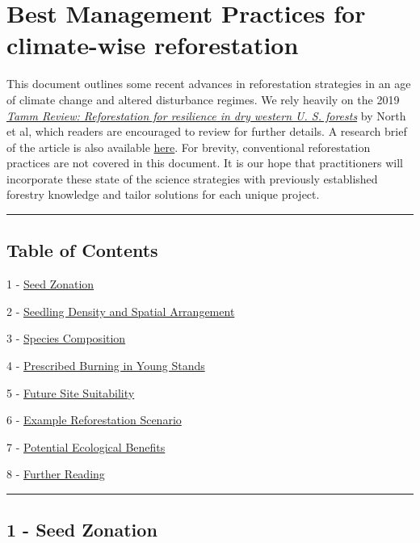\documentclass[]{article}
\title{}
\author{}
\date{}
\begin{document}
{
\setcounter{tocdepth}{2}
\tableofcontents
}
\hypertarget{top}{\section{Best Management Practices for climate-wise
reforestation}\label{top}}

This document outlines some recent advances in reforestation strategies
in an age of climate change and altered disturbance regimes. We rely
heavily on the 2019
\href{https://www.sciencedirect.com/science/article/pii/S0378112718313161?via\%3Dihub}{\emph{Tamm
Review: Reforestation for resilience in dry western U. S. forests}} by
North et al, which readers are encouraged to review for further details.
A research brief of the article is also available \href{}{here}. For
brevity, conventional reforestation practices are not covered in this
document. It is our hope that practitioners will incorporate these state
of the science strategies with previously established forestry knowledge
and tailor solutions for each unique project.

\begin{center}\rule{0.5\linewidth}{\linethickness}\end{center}

\subsection{Table of Contents}\label{table-of-contents}

1 - \protect\hyperlink{Link1}{Seed Zonation}

2 - \protect\hyperlink{Link2}{Seedling Density and Spatial Arrangement}

3 - \protect\hyperlink{Link3}{Species Composition}

4 - \protect\hyperlink{Link4}{Prescribed Burning in Young Stands}

5 - \protect\hyperlink{Link5}{Future Site Suitability}

6 - \protect\hyperlink{Link6}{Example Reforestation Scenario}

7 - \protect\hyperlink{Link7}{Potential Ecological Benefits}

8 - \protect\hyperlink{Link8}{Further Reading}

\begin{center}\rule{0.5\linewidth}{\linethickness}\end{center}

\hypertarget{Link1}{\subsection{1 - Seed Zonation}\label{Link1}}
\end{document}

